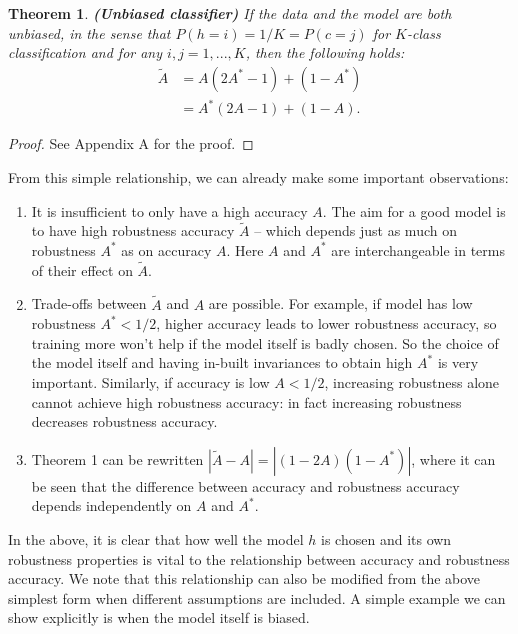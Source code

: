 \documentclass[onecolumn,prx, superscriptaddress,longbibliography,margin=1mm 11pt]{revtex4-2}
\newtheorem{theorem}{Theorem}
\begin{document}
\begin{theorem} \textbf{(Unbiased classifier)} \label{theorem1}
\textit{If the data and the model are both unbiased, in the sense that $P(h=i)=1/K=P(c=j)$ for $K$-class classification and for any $i,j=1,...,K$, then the following holds:
\begin{align} \label{eq:lemma1}
     \tilde{A} &= A(2A^*-1)+(1-A^*) \\
     &=A^*(2A-1)+(1-A).
\end{align}}
\end{theorem}
\begin{proof}
    See Appendix A for the proof. 
\end{proof}
From this simple relationship, we can already make some important observations:
\begin{enumerate}
    \item It is insufficient to only have a high accuracy $A$. The aim for a good model is to have high robustness accuracy $\tilde{A}$ -- which depends just as much on robustness $A^*$ as on accuracy $A$. Here $A$ and $A^*$ are interchangeable in terms of their effect on $\tilde{A}$. 
    \item Trade-offs between  $\tilde{A}$ and $A$ are possible. For example, if model has low robustness $A^*<1/2$, higher accuracy leads to lower robustness accuracy, so training more won't help if the model itself is badly chosen. So the choice of the model itself and having in-built invariances to obtain high $A^*$ is very important. Similarly, if accuracy is low $A<1/2$, increasing robustness alone cannot achieve high robustness accuracy: in fact increasing robustness decreases robustness accuracy. 
    \item Theorem 1 can be rewritten $|\tilde{A}-A|=|(1-2A)(1-A^*)|$, where it can be seen that the difference between accuracy and robustness accuracy depends independently on $A$ and $A^*$. 
\end{enumerate}
In the above, it is clear that how well the model $h$ is chosen and its own robustness properties is vital to the relationship between accuracy and robustness accuracy. We note that this relationship can also be modified from the above simplest form when different assumptions are included. A simple example we can show explicitly is when the model itself is biased. 
\end{document}

